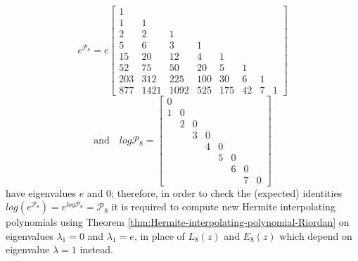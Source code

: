 \begin{example}
\begin{displaymath}
e^{\mathcal{P}_{8}} = e \left[\begin{matrix}1 &   &   &   &   &   &   &  \\1 & 1 &   &   &   &   &   &  \\2 & 2 & 1 &   &   &   &   &  \\5 & 6 & 3 & 1 &   &   &   &  \\15 & 20 & 12 & 4 & 1 &   &   &  \\52 & 75 & 50 & 20 & 5 & 1 &   &  \\203 & 312 & 225 & 100 & 30 & 6 & 1 &  \\877 & 1421 & 1092 & 525 & 175 & 42 & 7 & 1\end{matrix}\right]
\end{displaymath}
\begin{displaymath}
\text{and}\quad log{\mathcal{P}_{8}} = \left[\begin{matrix} 0 &   &   &   &   &   &   &  \\1 & 0   &   &   &   &   &   &  \\  & 2 &  0  &   &   &   &   &  \\  &   & 3 &  0  &   &   &   &  \\  &   &   & 4 &  0  &   &   &  \\  &   &   &   & 5 &  0  &   &  \\  &   &   &   &   & 6 &  0  &  \\  &   &   &   &   &   & 7 &  0 \end{matrix}\right]
\end{displaymath}
have eigenvalues $e$ and $0$; therefore, in order to check the (expected)
identities $log\left(e^{\mathcal{P}_{8}}\right) = e^{log{\mathcal{P}_{8}}} =
\mathcal{P}_{8}$ it is required to compute new Hermite interpolating
polynomials  using Theorem \ref{thm:Hermite-interpolating-polynomial-Riordan} on
eigenvalues $\lambda_{1}=0$ and $\lambda_{1}=e$, in place of $L_{8}(z)$ and
$E_{8}(z)$ which depend on eigenvalue $\lambda=1$ instead.


\end{example}
